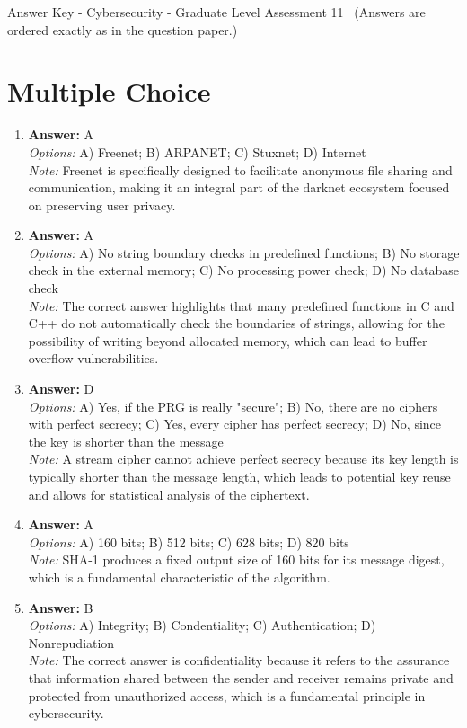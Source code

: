 \documentclass[12pt]{article}
\begin{document}
\begin{center}
Answer Key - Cybersecurity - Graduate Level Assessment 11 \
\small (Answers are ordered exactly as in the question paper.)
\end{center}

\section*{Multiple Choice}
\begin{enumerate}[label=\arabic*.]
\item \textbf{Answer:} A
\\ \textit{Options:} A) Freenet; B) ARPANET; C) Stuxnet; D) Internet
\\ \textit{Note:} Freenet is specifically designed to facilitate anonymous file sharing and communication, making it an integral part of the darknet ecosystem focused on preserving user privacy.
\item \textbf{Answer:} A
\\ \textit{Options:} A) No string boundary checks in predefined functions; B) No storage check in the external memory; C) No processing power check; D) No database check
\\ \textit{Note:} The correct answer highlights that many predefined functions in C and C++ do not automatically check the boundaries of strings, allowing for the possibility of writing beyond allocated memory, which can lead to buffer overflow vulnerabilities.
\item \textbf{Answer:} D
\\ \textit{Options:} A) Yes, if the PRG is really "secure"; B) No, there are no ciphers with perfect secrecy; C) Yes, every cipher has perfect secrecy; D) No, since the key is shorter than the message
\\ \textit{Note:} A stream cipher cannot achieve perfect secrecy because its key length is typically shorter than the message length, which leads to potential key reuse and allows for statistical analysis of the ciphertext.
\item \textbf{Answer:} A
\\ \textit{Options:} A) 160 bits; B) 512 bits; C) 628 bits; D) 820 bits
\\ \textit{Note:} SHA-1 produces a fixed output size of 160 bits for its message digest, which is a fundamental characteristic of the algorithm.
\item \textbf{Answer:} B
\\ \textit{Options:} A) Integrity; B) Condentiality; C) Authentication; D) Nonrepudiation
\\ \textit{Note:} The correct answer is confidentiality because it refers to the assurance that information shared between the sender and receiver remains private and protected from unauthorized access, which is a fundamental principle in cybersecurity.
\end{enumerate}
\end{document}
